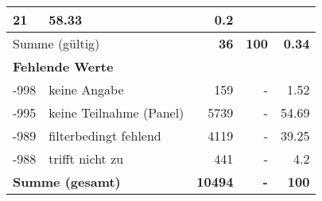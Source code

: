 \begin{longtable}{lXrrr}
       \num{21} &
       \num[round-mode=places,round-precision=2]{58,33} &
         \num[round-mode=places,round-precision=2]{0,2} \\
     \midrule
     \multicolumn{2}{l}{Summe (gültig)} &
       \textbf{\num{36}} &
     \textbf{100} &
       \textbf{\num[round-mode=places,round-precision=2]{0,34}} \\
     \multicolumn{5}{l}{\textbf{Fehlende Werte}}\\
       -998 &
       keine Angabe &
         \num{159} &
        - &
         \num[round-mode=places,round-precision=2]{1,52} \\
       -995 &
       keine Teilnahme (Panel) &
         \num{5739} &
        - &
         \num[round-mode=places,round-precision=2]{54,69} \\
       -989 &
       filterbedingt fehlend &
         \num{4119} &
        - &
         \num[round-mode=places,round-precision=2]{39,25} \\
       -988 &
       trifft nicht zu &
         \num{441} &
        - &
         \num[round-mode=places,round-precision=2]{4,2} \\
     \midrule
     \multicolumn{2}{l}{\textbf{Summe (gesamt)}} &
          \textbf{\num{10494}} &
        \textbf{-} &
        \textbf{100} \\
     \bottomrule
     \end{longtable}
     
